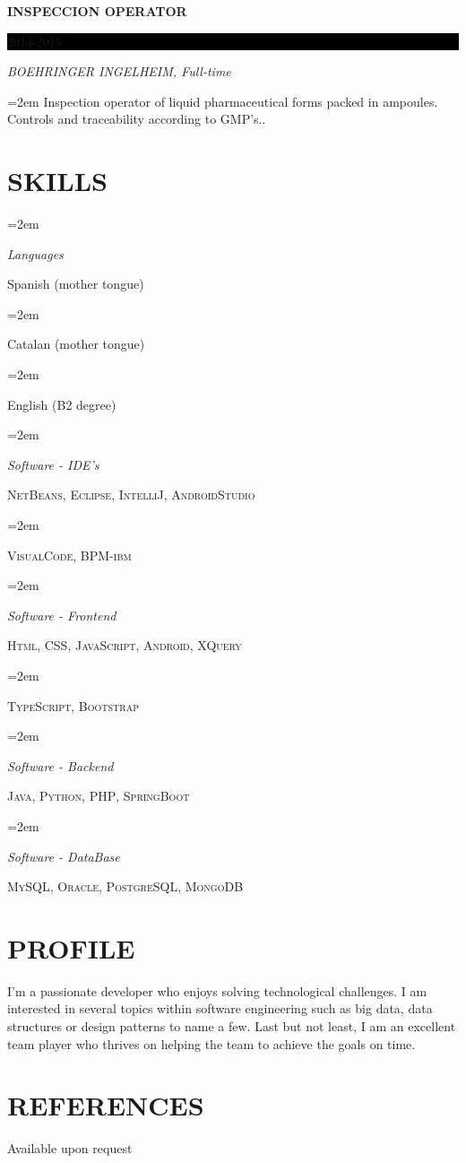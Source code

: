 \documentclass[paper=a4,fontsize=11pt]{scrartcl} %
\newlength{\spacebox}
\newcommand{\sepspace}{\vspace*{1em}}		%
\newcommand{\NewPart}[1]{\section*{\uppercase{#1}}}
\newcommand{\PersonalEntry}[2]{
		\noindent\hangindent=2em\hangafter=0 %
		\parbox{\spacebox}{        %
		\textit{#1}}		       %
		\hspace{1.5em} #2 \par}    %
\newcommand{\SkillsEntry}[2]{      %
		\noindent\hangindent=2em\hangafter=0 %
		\parbox{\spacebox}{        %
		\textit{#1}}			   %
		\hspace{1.5em} #2 \par}    %
\newcommand{\EducationEntry}[4]{
		\noindent \textbf{#1} \hfill      %
		\colorbox{Black}{%
			\parbox{6em}{%
			\hfill\color{White}#2}} \par  %
		\noindent \textit{#3} \par        %
		\noindent\hangindent=2em\hangafter=0 \small #4 %
		\normalsize \par}
\begin{document}
\EducationEntry{INSPECCION OPERATOR}{2014-2015}{BOEHRINGER INGELHEIM, Full-time}{Inspection operator of liquid pharmaceutical forms packed in ampoules. Controls and traceability according to GMP's..}
\sepspace

\NewPart{Skills}{}

\SkillsEntry{Languages}{Spanish (mother tongue)}
\SkillsEntry{}{Catalan (mother tongue)}
\SkillsEntry{}{English (B2 degree)}
\sepspace

\SkillsEntry{Software - IDE's}{\textsc{NetBeans}, \textsc{Eclipse}, \textsc{IntelliJ}, \textsc{AndroidStudio}}
\SkillsEntry{}{\textsc{VisualCode}, \textsc{BPM-ibm}}
\sepspace

\SkillsEntry{Software - Frontend}{\textsc{Html}, \textsc{CSS}, \textsc{JavaScript}, \textsc{Android}, \textsc{XQuery}}
\SkillsEntry{}{\textsc{TypeScript}, \textsc{Bootstrap}}
\sepspace

\SkillsEntry{Software - Backend}{\textsc{Java}, \textsc{Python}, \textsc{PHP}, \textsc{SpringBoot}}
\sepspace

\SkillsEntry{Software - DataBase}{\textsc{MySQL, Oracle, PostgreSQL, MongoDB}}
\sepspace

\NewPart{Profile}{}
I'm a passionate developer who enjoys solving technological challenges. I am interested in several topics within software engineering such as big data, data structures or design patterns to name a few. Last but not least, I am an excellent team player who thrives on helping the team to achieve the goals on time.

\NewPart{References}{}
Available upon request
\end{document}
